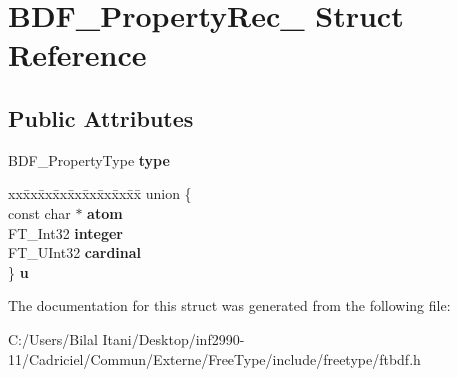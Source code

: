 \hypertarget{struct_b_d_f___property_rec__}{}\section{B\+D\+F\+\_\+\+Property\+Rec\+\_\+ Struct Reference}
\label{struct_b_d_f___property_rec__}
\subsection*{Public Attributes}
\begin{DoxyCompactItemize}
\item 
B\+D\+F\+\_\+\+Property\+Type {\bfseries type}\hypertarget{struct_b_d_f___property_rec___a88c19ee6f16bd1b36127f5f7d44a4e39}{}\label{struct_b_d_f___property_rec___a88c19ee6f16bd1b36127f5f7d44a4e39}

\item 
\begin{tabbing}
xx\=xx\=xx\=xx\=xx\=xx\=xx\=xx\=xx\=\kill
union \{\\
\>const char $\ast$ {\bfseries atom}\\
\>FT\_Int32 {\bfseries integer}\\
\>FT\_UInt32 {\bfseries cardinal}\\
\} {\bfseries u}\hypertarget{struct_b_d_f___property_rec___ad0b90c890b8517d70b0f21a063840fe4}{}\label{struct_b_d_f___property_rec___ad0b90c890b8517d70b0f21a063840fe4}
\\

\end{tabbing}\end{DoxyCompactItemize}


The documentation for this struct was generated from the following file\+:\begin{DoxyCompactItemize}
\item 
C\+:/\+Users/\+Bilal Itani/\+Desktop/inf2990-\/11/\+Cadriciel/\+Commun/\+Externe/\+Free\+Type/include/freetype/ftbdf.\+h\end{DoxyCompactItemize}
